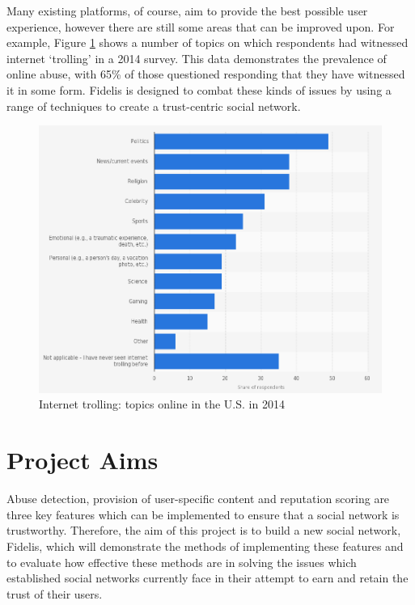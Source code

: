 Many existing platforms, of course, aim to provide the best possible user experience, however there are still some areas that can be improved upon. For example, Figure \ref{fig:TrollingByTopic} shows a number of topics on which respondents had witnessed internet `trolling' in a 2014 survey. This data demonstrates the prevalence of online abuse, with 65\% of those questioned responding that they have witnessed it in some form. Fidelis is designed to combat these kinds of issues by using a range of techniques to create a trust-centric social network.

\begin{figure}[H]
  \centering
  \includegraphics[width=1.0\textwidth]{Images/Introduction/TrollingByTopic}
  \caption{Internet trolling: topics online in the U.S. in 2014 \cite{Statista:TrollingByTopic}} \label{fig:TrollingByTopic} 
\end{figure}

\section{Project Aims}
Abuse detection, provision of user-specific content and reputation scoring are three key features which can be implemented to ensure that a social network is trustworthy. Therefore, the aim of this project is to build a new social network, Fidelis, which will demonstrate the methods of implementing these features and to evaluate how effective these methods are in solving the issues which established social networks currently face in their attempt to earn and retain the trust of their users.

